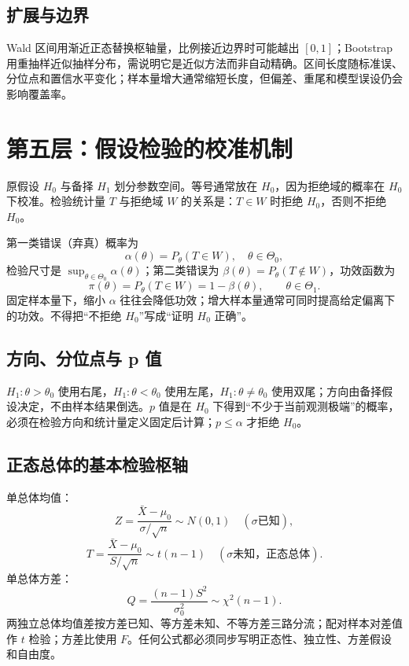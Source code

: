 \documentclass[11pt,a4paper]{ctexart}
\begin{document}
\subsection{扩展与边界}

Wald 区间用渐近正态替换枢轴量，比例接近边界时可能越出 $[0,1]$；Bootstrap 用重抽样近似抽样分布，需说明它是近似方法而非自动精确。区间长度随标准误、分位点和置信水平变化；样本量增大通常缩短长度，但偏差、重尾和模型误设仍会影响覆盖率。

\section{第五层：假设检验的校准机制}

原假设 $H_0$ 与备择 $H_1$ 划分参数空间。等号通常放在 $H_0$，因为拒绝域的概率在 $H_0$ 下校准。检验统计量 $T$ 与拒绝域 $W$ 的关系是：$T\in W$ 时拒绝 $H_0$，否则不拒绝 $H_0$。

第一类错误（弃真）概率为
\[
\alpha(\theta)=P_\theta(T\in W),\quad \theta\in\Theta_0,
\]
检验尺寸是 $\sup_{\theta\in\Theta_0}\alpha(\theta)$；第二类错误为 $\beta(\theta)=P_\theta(T\notin W)$，功效函数为
\[
\pi(\theta)=P_\theta(T\in W)=1-\beta(\theta),\qquad \theta\in\Theta_1.
\]
固定样本量下，缩小 $\alpha$ 往往会降低功效；增大样本量通常可同时提高给定偏离下的功效。不得把“不拒绝 $H_0$”写成“证明 $H_0$ 正确”。

\subsection{方向、分位点与 p 值}

$H_1:\theta>\theta_0$ 使用右尾，$H_1:\theta<\theta_0$ 使用左尾，$H_1:\theta\ne\theta_0$ 使用双尾；方向由备择假设决定，不由样本结果倒选。$p$ 值是在 $H_0$ 下得到“不少于当前观测极端”的概率，必须在检验方向和统计量定义固定后计算；$p\leq\alpha$ 才拒绝 $H_0$。

\subsection{正态总体的基本检验枢轴}

单总体均值：
\[
Z=\frac{\bar X-\mu_0}{\sigma/\sqrt n}\sim N(0,1)\quad(\sigma\text{已知}),
\]
\[
T=\frac{\bar X-\mu_0}{S/\sqrt n}\sim t(n-1)\quad(\sigma\text{未知，正态总体}).
\]
单总体方差：
\[
Q=\frac{(n-1)S^2}{\sigma_0^2}\sim\chi^2(n-1).
\]
两独立总体均值差按方差已知、等方差未知、不等方差三路分流；配对样本对差值作 $t$ 检验；方差比使用 $F$。任何公式都必须同步写明正态性、独立性、方差假设和自由度。
\end{document}
